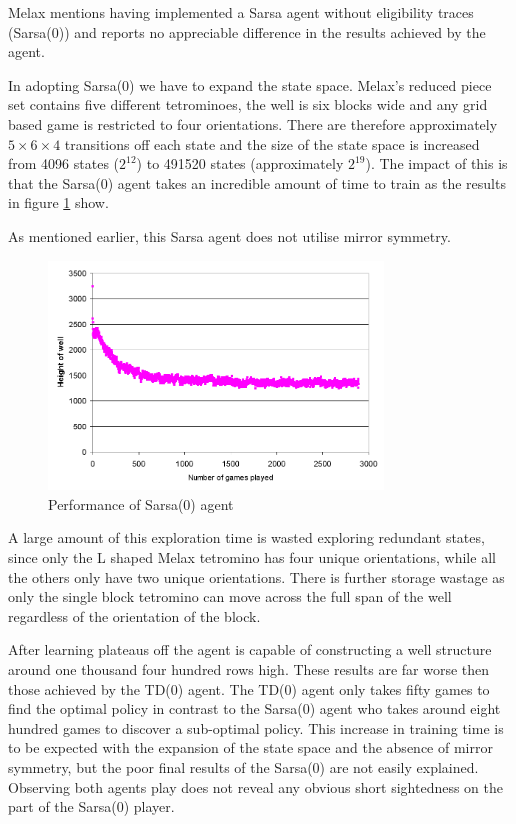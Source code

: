\documentclass{rucsthesis}
\begin{document}
Melax mentions having implemented a Sarsa agent without eligibility traces (Sarsa(0)) and reports no appreciable difference in the results achieved by the agent. 

In adopting Sarsa(0) we have to expand the state space. Melax's reduced piece set contains five different tetrominoes, the well is six blocks wide and any grid based game is restricted to four orientations. There are therefore approximately $5\times6\times4$ transitions off each state and the size of the state space is increased from 4096 states ($2^{12}$) to 491520 states (approximately $2^{19}$). The impact of this is that the Sarsa(0) agent takes an incredible amount of time to train as the results in figure \ref{fig:melaxsarsa} show.

As mentioned earlier, this Sarsa agent does not utilise mirror symmetry.

\begin{figure}[h]
\centering
\includegraphics[width=3.5in]{sarsamelax.png}
\caption{Performance of Sarsa(0) agent}
\label{fig:melaxsarsa}
\end{figure} 

A large amount of this exploration time is wasted exploring redundant states, since only the L shaped Melax tetromino has four unique orientations, while all the others only have two unique orientations. There is further storage wastage as only the single block tetromino can move across the full span of the well regardless of the orientation of the block. 

After learning plateaus off the agent is capable of constructing a well structure around one thousand four hundred rows high. These results are far worse then those achieved by the TD(0) agent. The TD(0) agent only takes fifty games to find the optimal policy in contrast to the Sarsa(0) agent who takes around eight hundred games to discover a sub-optimal policy. This increase in training time is to be expected with the expansion of the state space and the absence of mirror symmetry, but the poor final results of the Sarsa(0) are not easily explained. Observing both agents play does not reveal any obvious short sightedness on the part of the Sarsa(0) player.
\end{document}
